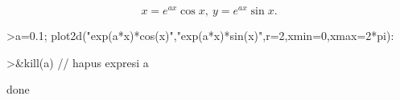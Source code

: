\documentclass{article}
\begin{document}
\begin{eulernotebook}
\begin{eulercomment}
\begin{eulercomment}
\begin{eulercomment}
\begin{eulercomment}
\begin{eulercomment}
\end{eulercomment}
\begin{eulerformula}
\[
x=e^{ax}\cos x,\ y=e^{ax}\sin x.
\]
\end{eulerformula}
\begin{eulerprompt}
>a=0.1; plot2d("exp(a*x)*cos(x)","exp(a*x)*sin(x)",r=2,xmin=0,xmax=2*pi):
\end{eulerprompt}
\begin{eulerprompt}
>&kill(a) // hapus expresi a
\end{eulerprompt}
\begin{euleroutput}
  
                                   done
  
\end{euleroutput}
\begin{eulerformula}
\[
\]
\end{eulerformula}
\end{eulercomment}
\end{eulercomment}
\end{eulercomment}
\end{eulercomment}
\end{eulernotebook}
\end{document}
